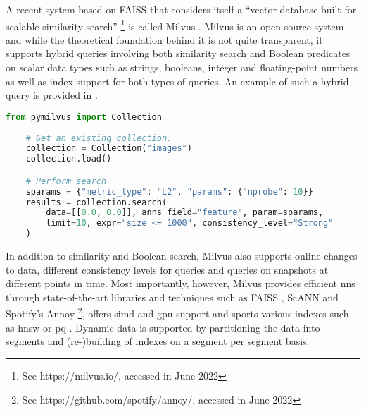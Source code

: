 A recent system based on FAISS that considers itself a ``vector database built for scalable similarity search'' \footnote{See https://milvus.io/, accessed in June 2022} is called Milvus \cite{Wang:2021Milvus}. Milvus is an open-source system and while the theoretical foundation behind it is not quite transparent, it supports hybrid queries involving both similarity search and Boolean predicates on scalar data types such as strings, booleans, integer and floating-point numbers as well as index support for both types of queries. An example of such a hybrid query is provided in . 

\begin{lstlisting}[language=Python, caption={Example of a hybrid query to Milvus in Python. The \texttt{expr} parameter can be used to specify Boolean filters. Source: https://milvus.io/}, label={listing:milvus_query}]
    from pymilvus import Collection
    
    # Get an existing collection.
    collection = Collection("images")      
    collection.load()

    # Perform search
    sparams = {"metric_type": "L2", "params": {"nprobe": 10}}
    results = collection.search(
        data=[[0.0, 0.0]], anns_field="feature", param=sparams, 
        limit=10, expr="size <= 1000", consistency_level="Strong"
    )
\end{lstlisting}

In addition to similarity and Boolean search, Milvus also supports online changes to data, different consistency levels for queries and queries on snapshots at different points in time. Most importantly, however, Milvus provides efficient \acrshort{nns} through state-of-the-art libraries and techniques such as FAISS \cite{Johnson:2019Billion}, ScANN \cite{Guo:2020Accelerating} and Spotify's Annoy \footnote{See https://github.com/spotify/annoy/, accessed in June 2022}, offers \acrshort{simd} and \acrshort{gpu} support and sports various indexes such as \acrshort{hnsw} \cite{Malkov:2018Efficient} or \acrshort{pq} \cite{Jegou:2010Product}. Dynamic data is supported by partitioning the data into segments and (re-)building of indexes on a segment per segment basis.
